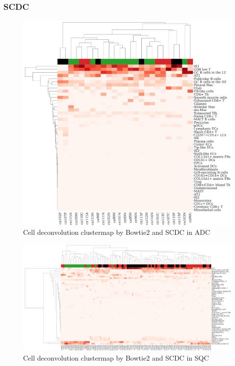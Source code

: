 \documentclass[11pt,a4paper,onecolumn,oneside]{report}
\begin{document}
            \subsubsection{SCDC}
                \begin{figure}[p]
                    \centering
                    \includegraphics[width=0.6 \linewidth]{figures/SCDC/clustermap/Bowtie2.ADC.cluster.pdf}
                    \caption{Cell deconvolution clustermap by Bowtie2 and SCDC in ADC}
                    \label{fig:Deconvolution-SCDC-Bowtie2-cluster-ADC}
                \end{figure}

                \begin{figure}[p]
                    \centering
                    \includegraphics[width=\linewidth]{figures/SCDC/clustermap/Bowtie2.SQC.cluster.pdf}
                    \caption{Cell deconvolution clustermap by Bowtie2 and SCDC in SQC}
                    \label{fig:Deconvolution-SCDC-Bowtie2-cluster-SQC}
                \end{figure}
\end{document}

